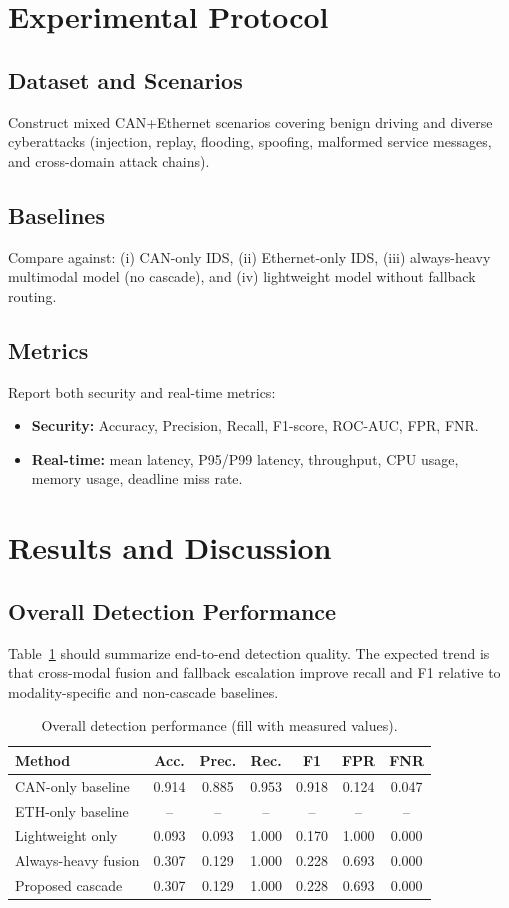 \documentclass[conference]{IEEEtran}
\begin{document}
\section{Experimental Protocol}
\subsection{Dataset and Scenarios}
Construct mixed CAN+Ethernet scenarios covering benign driving and diverse cyberattacks (injection, replay, flooding, spoofing, malformed service messages, and cross-domain attack chains).

\subsection{Baselines}
Compare against: (i) CAN-only IDS, (ii) Ethernet-only IDS, (iii) always-heavy multimodal model (no cascade), and (iv) lightweight model without fallback routing.

\subsection{Metrics}
Report both security and real-time metrics:
\begin{itemize}
    \item \textbf{Security:} Accuracy, Precision, Recall, F1-score, ROC-AUC, FPR, FNR.
    \item \textbf{Real-time:} mean latency, P95/P99 latency, throughput, CPU usage, memory usage, deadline miss rate.
\end{itemize}

\section{Results and Discussion}
\subsection{Overall Detection Performance}
Table~\ref{tab:overall} should summarize end-to-end detection quality. The expected trend is that cross-modal fusion and fallback escalation improve recall and F1 relative to modality-specific and non-cascade baselines.

\begin{table}[t]
\centering
\caption{Overall detection performance (fill with measured values).}
\label{tab:overall}
\scriptsize
\begin{tabular}{lcccccc}
\toprule
Method & Acc. & Prec. & Rec. & F1 & FPR & FNR \\
\midrule
CAN-only baseline & 0.914 & 0.885 & 0.953 & 0.918 & 0.124 & 0.047 \\
ETH-only baseline & -- & -- & -- & -- & -- & -- \\
Lightweight only & 0.093 & 0.093 & 1.000 & 0.170 & 1.000 & 0.000 \\
Always-heavy fusion & 0.307 & 0.129 & 1.000 & 0.228 & 0.693 & 0.000 \\
Proposed cascade & 0.307 & 0.129 & 1.000 & 0.228 & 0.693 & 0.000 \\
\bottomrule
\end{tabular}
\end{table}
\end{document}

